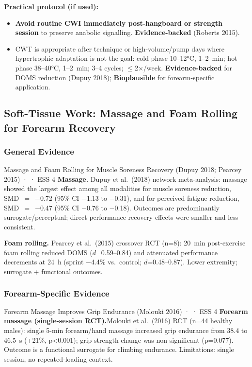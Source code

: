 \textbf{Practical protocol (if used):}
\begin{itemize}[noitemsep]
  \item \textbf{Avoid routine CWI immediately post-hangboard or strength session} to preserve anabolic signalling. \textbf{Evidence-backed} (Roberts 2015).
  \item CWT is appropriate after technique or high-volume/pump days where hypertrophic adaptation is not the goal: cold phase 10--12°C, 1--2~min; hot phase 38--40°C, 1--2~min; 3--4 cycles; $\leq$2$\times$/week. \textbf{Evidence-backed} for DOMS reduction (Dupuy 2018); \textbf{Bioplausible} for forearm-specific application.
\end{itemize}

\subsection{Soft-Tissue Work: Massage and Foam Rolling for Forearm Recovery}

\subsubsection*{General Evidence}

\begin{evidencebox}{Massage and Foam Rolling for Muscle Soreness Recovery (Dupuy 2018; Pearcey 2015) · \evidencebacked · ESS 4}
\textbf{Massage.} Dupuy et al.\ (2018) network meta-analysis: massage showed the largest effect among all modalities for muscle soreness reduction, SMD~$=$~$-$0.72 (95\% CI $-$1.13 to $-$0.31), and for perceived fatigue reduction, SMD~$=$~$-$0.47 (95\% CI $-$0.76 to $-$0.18). Outcomes are predominantly surrogate/perceptual; direct performance recovery effects were smaller and less consistent. \cite{DDT+18}

\textbf{Foam rolling.} Pearcey et al.\ (2015) crossover RCT (n=8): 20~min post-exercise foam rolling reduced DOMS ($d$=0.59--0.84) and attenuated performance decrements at 24~h (sprint $-$4.4\% vs.\ control; $d$=0.48--0.87). Lower extremity; surrogate + functional outcomes. \cite{PBSK+15}
\end{evidencebox}

\subsubsection*{Forearm-Specific Evidence}

\begin{evidencebox}{Forearm Massage Improves Grip Endurance (Molouki 2016) · \evidencebacked · ESS 4}
\textbf{Forearm massage (single-session RCT).}\singlesource Molouki et al.\ (2016) RCT (n=44 healthy males): single 5-min forearm/hand massage increased grip endurance from 38.4 to 46.5~s (+21\%, p<0.001); grip strength change was non-significant (p=0.077). Outcome is a functional surrogate for climbing endurance. Limitations: single session, no repeated-loading context.
\end{evidencebox}

